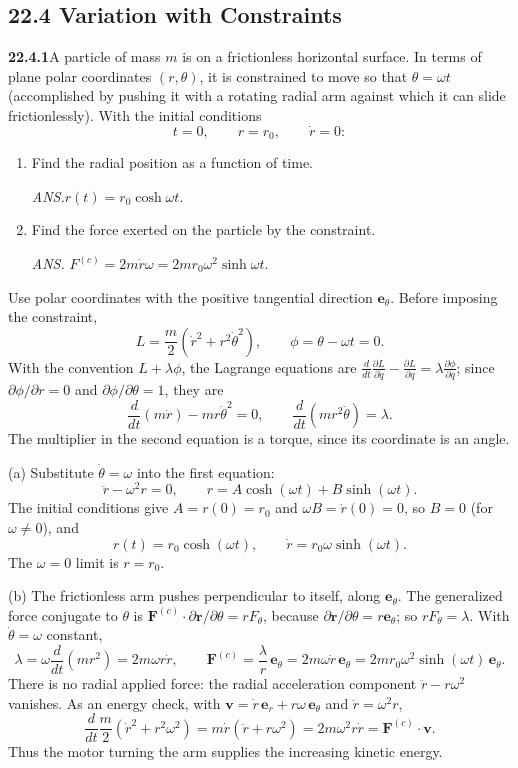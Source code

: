 \subsection*{22.4 Variation with Constraints}

\par\bigskip
\noindent\textbf{22.4.1}\quad A particle of mass $m$ is on a
frictionless horizontal surface. In terms of plane polar
coordinates $(r,\theta)$, it is constrained to move so that
$\theta=\omega t$ (accomplished by pushing it with a rotating
radial arm against which it can slide frictionlessly). With the
initial conditions
\[
t=0,\qquad r=r_{0},\qquad\dot{r}=0:
\]
\begin{enumerate}
\item[(a)] Find the radial position as a function of time.
\par\nobreak\hfill\emph{ANS.}\enspace$r(t)=r_{0}\cosh\omega t$.
\item[(b)] Find the force exerted on the particle by the
constraint.
\par\nobreak\hfill\emph{ANS.}\enspace
$F^{(c)}=2m\dot{r}\omega=2mr_{0}\omega^{2}\sinh\omega t$.
\end{enumerate}
\solution
Use polar coordinates with the positive tangential direction
$\mathbf e_\theta$.  Before imposing the constraint,
\[
 L=\frac m2(\dot r^2+r^2\dot\theta^2),\qquad
 \phi=\theta-\omega t=0.
\]
With the convention $L+\lambda\phi$, the Lagrange equations are
$\frac d{dt}\frac{\partial L}{\partial\dot q}-\frac{\partial L}{\partial q}
=\lambda\frac{\partial\phi}{\partial q}$; since
$\partial\phi/\partial r=0$ and $\partial\phi/\partial\theta=1$, they are
\[
 \frac{d}{dt}(m\dot r)-mr\dot\theta^2=0,\qquad
 \frac{d}{dt}(mr^2\dot\theta)=\lambda.
\]
The multiplier in the second equation is a torque, since its
coordinate is an angle.

(a) Substitute $\dot\theta=\omega$ into the first equation:
\[
 \ddot r-\omega^2r=0,\qquad
 r=A\cosh(\omega t)+B\sinh(\omega t).
\]
The initial conditions give $A=r(0)=r_0$ and $\omega B=\dot r(0)=0$,
so $B=0$ (for $\omega\ne0$), and
\[
 \boxed{r(t)=r_0\cosh(\omega t)},\qquad
 \dot r=r_0\omega\sinh(\omega t).
\]
The $\omega=0$ limit is $r=r_0$.

(b) The frictionless arm pushes perpendicular to itself, along
$\mathbf e_\theta$.  The generalized force conjugate to $\theta$ is
$\mathbf F^{(c)}\cdot\partial\mathbf r/\partial\theta=rF_\theta$,
because $\partial\mathbf r/\partial\theta=r\mathbf e_\theta$; so
$rF_\theta=\lambda$. With $\dot\theta=\omega$ constant,
\[
 \lambda=\omega\frac{d}{dt}(mr^2)=2m\omega r\dot r,\qquad
 \boxed{\mathbf F^{(c)}=\frac\lambda r\,\mathbf e_\theta
 =2m\omega\dot r\,\mathbf e_\theta
 =2mr_0\omega^2\sinh(\omega t)\,\mathbf e_\theta}.
\]
There is no radial applied force: the radial acceleration component
$\ddot r-r\omega^2$ vanishes.  As an energy check, with
$\mathbf v=\dot r\,\mathbf e_r+r\omega\,\mathbf e_\theta$ and
$\ddot r=\omega^2r$,
\[
 \frac{d}{dt}\frac m2(\dot r^2+r^2\omega^2)
 =m\dot r(\ddot r+r\omega^2)
 =2m\omega^2r\dot r
 =\mathbf F^{(c)}\cdot\mathbf v.
\]
Thus the motor turning the arm supplies the increasing kinetic energy.


